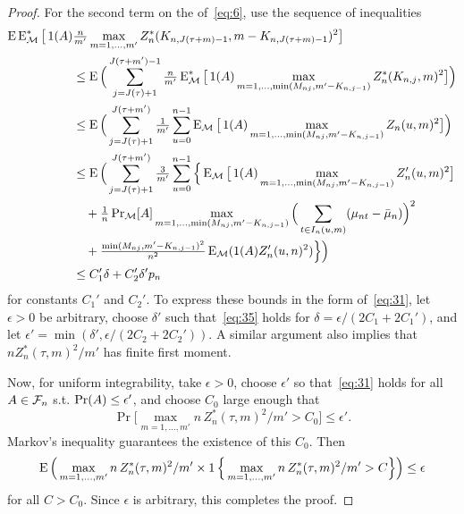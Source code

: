 \documentclass[11pt]{article}
\begin{document}
\begin{proof}
  For the second term on the  of~\eqref{eq:6}, use the
  sequence of inequalities
  \begin{align*}
  \operatorname{E} \operatorname{E}_{\mathcal{M}}^* \big[\operatorname{1}(A) &\tfrac{n}{m'}
  \max_{m=1,\dots,m'} Z_n^*(K_{n,J(\tau+m)-1}, m - K_{n,J(\tau + m)-1})^2 \big] \\
  &\leq \operatorname{E} \Big(\sum_{j=J(\tau) + 1}^{J(\tau+m')-1} \tfrac{n}{m'} \operatorname{E}_{\mathcal{M}}^* \big[\operatorname{1}(A)
  \max_{m=1,\dots, \min(M_{nj}, m' - K_{n,j-1})} Z_n^*(K_{n,j}, m)^2 \big]\Big) \\
  &\leq \operatorname{E} \Big(\sum_{j=J(\tau) + 1}^{J(\tau+m')} \tfrac{1}{m'} \sum_{u=0}^{n-1} \operatorname{E}_{\mathcal{M}} \big[\operatorname{1}(A)
  \max_{m=1,\dots,\min(M_{nj}, m' - K_{n,j-1})} Z_n(u, m)^2 \big]\Big) \\
  &\leq \operatorname{E} \Big(\sum_{j=J(\tau) + 1}^{J(\tau+m')} \tfrac{3}{m'} \sum_{u=0}^{n-1} \Big\{
  \operatorname{E}_{\mathcal{M}} \big[\operatorname{1}(A)
  \max_{m=1,\dots,\min(M_{nj}, m' - K_{n,j-1})} Z_n'(u, m)^2 \big] \\
  &\quad +
  \tfrac{1}{n} \operatorname{Pr}_{\mathcal{M}}[A] \max_{m = 1,\dots,\min(M_{nj}, m'-K_{n,j-1})}
  \Big(\sum_{t \in I_n(u,m)} (\mu_{nt} - \bar{\mu}_n)\Big)^2 \\
  &\quad+ \tfrac{\min(M_{nj},m'-K_{n,j-1})^2}{n^2} \operatorname{E}_{\mathcal{M}}( \operatorname{1}(A) Z_n'(u, n)^2 ) \Big\}\Big)\\
  &\leq C'_1 \delta + C_2' \delta' p_n
  \end{align*}
  for constants $C_1'$ and $C_2'$. To express these bounds in the form
  of~\eqref{eq:31}, let $\epsilon > 0$ be arbitrary, choose $\delta'$
  such that~\eqref{eq:35} holds for $\delta = \epsilon/(2C_1+2C_1')$,
  and let $\epsilon' = \min(\delta', \epsilon/(2 C_2 + 2C_2'))$.
  A similar argument also
  implies that $n Z_n^*(\tau, m)^2 / m'$ has finite first moment.

  Now, for uniform integrability, take $\epsilon > 0$, choose
  $\epsilon'$ so that~\eqref{eq:31} holds for all $A \in \mathcal{F}_n$
  s.t. $\operatorname{Pr}(A) \leq \epsilon'$, and choose $C_0$ large enough that
  \begin{equation*}
    \Pr\Big[ \max_{m = 1,\dots,m'} n \, Z^*_n(\tau, m)^2 / m' > C_0 \Big] \leq \epsilon'.
  \end{equation*}
  Markov's inequality guarantees the existence of this $C_0$. Then
  \begin{equation*}
    \operatorname{E} \Big(\max_{m = 1,\dots,m'} n \, Z^*_n(\tau, m)^2 / m'
    \times \operatorname{1}\Big\{ \max_{m = 1,\dots,m'} n \, Z^*_n(\tau, m)^2 / m' > C \Big\}\Big) \leq \epsilon
  \end{equation*}
  for all $C > C_0$. Since $\epsilon$ is arbitrary, this completes the proof.
\end{proof}
\end{document}
